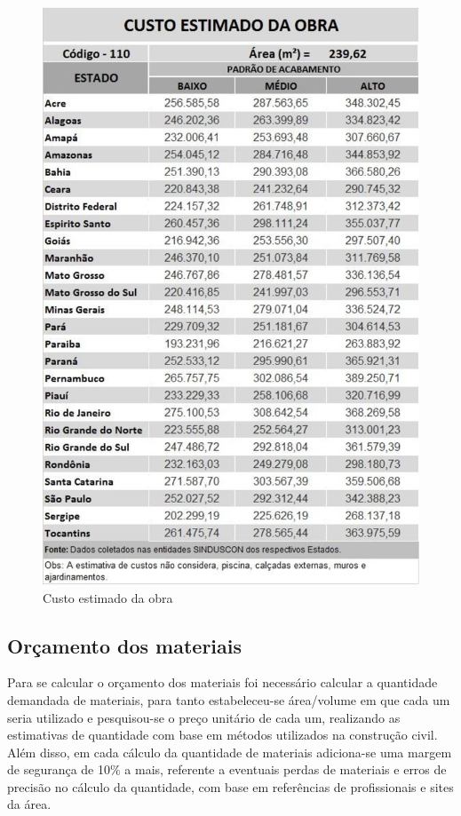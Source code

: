 \newpage
\begin{figure}[H]
  \begin{center}
	\includegraphics[keepaspectratio,scale=1,angle=0]{figuras/custo_da_obra.eps}
	\caption{Custo estimado da obra}
  \end{center}
\end{figure}

\subsection*{\textbf{Orçamento dos materiais}}

	Para se calcular o orçamento dos materiais foi necessário calcular a quantidade demandada de materiais, para tanto estabeleceu-se área/volume em que cada um seria utilizado e pesquisou-se o preço unitário de cada um, realizando as estimativas de quantidade com base em métodos utilizados na construção civil. Além disso, em cada cálculo da quantidade de materiais adiciona-se uma margem de segurança de 10\% a mais, referente a eventuais perdas de materiais e erros de precisão no cálculo da quantidade, com base em referências de profissionais e sites da área.

